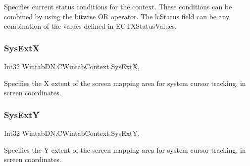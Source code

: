 Specifies current status conditions for the context. These conditions can be combined by using the bitwise OR operator. The lc\+Status field can be any combination of the values defined in E\+C\+T\+X\+Status\+Values. 

\mbox{\label{class_wintab_d_n_1_1_c_wintab_context_af7bb13537c0ce3d915309bcc4de86bb3}} 
\subsubsection{\texorpdfstring{Sys\+ExtX}{SysExtX}}
{\footnotesize\ttfamily Int32 Wintab\+D\+N.\+C\+Wintab\+Context.\+Sys\+ExtX\hspace{0.3cm}{\ttfamily [get]}, {\ttfamily [set]}}



Specifies the X extent of the screen mapping area for system cursor tracking, in screen coordinates. 

\mbox{\label{class_wintab_d_n_1_1_c_wintab_context_abcafe640181563d36f23c87433f485a5}} 
\subsubsection{\texorpdfstring{Sys\+ExtY}{SysExtY}}
{\footnotesize\ttfamily Int32 Wintab\+D\+N.\+C\+Wintab\+Context.\+Sys\+ExtY\hspace{0.3cm}{\ttfamily [get]}, {\ttfamily [set]}}



Specifies the Y extent of the screen mapping area for system cursor tracking, in screen coordinates. 

\mbox{\label{class_wintab_d_n_1_1_c_wintab_context_a50763a15570f18f433580630dfa7fe8a}} 

